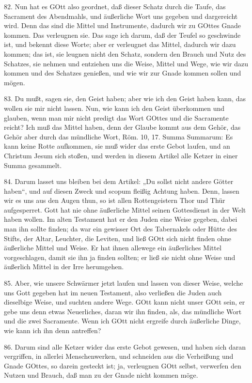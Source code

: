 82. Nun hat es GOtt also geordnet, daß dieser Schatz durch die Taufe, das Sacrament des Abendmahls, und äußerliche Wort uns gegeben und dargereicht wird. Denn das sind die Mittel und Instrumente, dadurch wir zu GOttes Gnade kommen. Das verleugnen sie. Das sage ich darum, daß der Teufel so geschwinde ist, und bekennt diese Worte; aber er verleugnet das Mittel, dadurch wir dazu kommen; das ist, sie leugnen nicht den Schatz, sondern den Brauch und Nutz des Schatzes, sie nehmen und entziehen uns die Weise, Mittel und Wege, wie wir dazu kommen und des Schatzes genießen, und wie wir zur Gnade kommen sollen und mögen.

83. Du mußt, sagen sie, den Geist haben; aber wie ich den Geist haben kann, das wollen sie mir nicht lassen. Nun, wie kann ich den Geist überkommen und glauben, wenn man mir nicht predigt das Wort GOttes und die Sacramente reicht? Ich muß das Mittel haben, denn der Glaube kommt aus dem Gehör, das Gehör
aber durch das mündliche Wort, Röm. 10, 17. Summa Summarum: Es kann keine Rotte aufkommen, sie muß wider das erste Gebot laufen, und an Christum Jesum sich stoßen, und werden in diesem Artikel alle Ketzer in einer Summa gesammelt.

84. Darum lasset uns bleiben bei dem Artikel: „Du sollst nicht andere Götter haben“, und auf diesen Zweck und scopum fleißig Achtung haben. Denn, lassen wir es uns aus den Augen thun, so ist allen Rottengeistern Thor und Thür aufgesperret. Gott hat nie ohne äußerliche Mittel seinen Gottesdienst in der Welt haben wollen. Im alten Testament hat er den Juden eine Weise gegeben, dabei man ihn sollte finden; da war ein gewisser Ort des Tabernakels oder Hütte des Stifts, der Altar, Leuchter, die Leviten, und ließ GOtt sich nicht finden ohne äußerliche Mittel und Weise. Er hat ihnen allewege ein äußerliches Mittel vorgeschlagen, damit sie ihn ja finden sollten; er ließ sie nicht ohne Weise und äußerlich Mittel in der Irre herumgehen.

85. Aber, wie unsere Schwärmer jetzt laufen und lassen von dieser Weise, welche uns Gott gegeben hat im neuen Testament, also verließen die Juden auch dieselbige Weise, und suchten andere Wege. GOtt kann nicht unser GOtt sein, er gebe uns denn etwas Neuerliches, daran wir ihn finden, als, das mündliche Wort und die zwei Sacramente. Wenn ich GOtt nicht ergreife durch äußerliche Dinge, wie kann ich ihn denn antreffen?

86. Darum sind alle Ketzer wider das erste Gebot gewesen, und haben sich daran vergriffen, in allerlei Menschenwerken, und schneiden aus die Verheißung und Gnade GOttes, so darein gesteckt ist; ja, verleugnen GOtt selbst, verwerfen den Nutzen und Brauch, daß man zu der Gnade nicht kommen möge.

